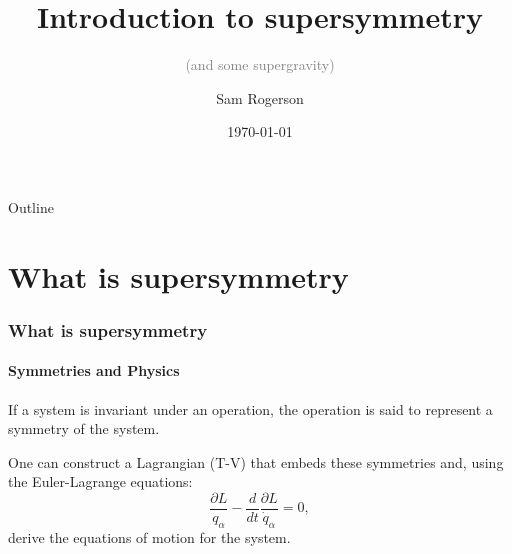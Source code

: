 \documentclass{beamer}
\begin{document}
\title{Introduction to supersymmetry}
\subtitle{\textcolor{gray}{(and some supergravity)}}
\author{Sam Rogerson}
\date{\today}

\begin{frame}[plain]
  \titlepage
\end{frame}

\begin{frame}{Outline}
  \tableofcontents [part=1,hideallsubsections,]
  \tableofcontents [part=2,hideallsubsections,] 
  \tableofcontents [part=3,hideallsubsections,] 
  \tableofcontents [part=4,hideallsubsections,] 
  \tableofcontents [part=5,hideallsubsections,] 
  \tableofcontents [part=6,hideallsubsections,] 
\end{frame}


\part{What is supersymmetry}
\section{What is supersymmetry}
\frame{\partpage}

\subsection{Symmetries and Physics}
\begin{frame}{\insertsubsection}
  \begin{definition}
    If a system is invariant under an operation, the operation is said to represent a symmetry
    of the system.
  \end{definition}
  One can construct a Lagrangian (T-V) that embeds these symmetries and, using the
  Euler-Lagrange equations:
  \begin{equation*}
    \frac{\partial L}{q_{\alpha}}-\frac{d}{dt}\frac{\partial
    L}{\dot{q}_{\alpha}}=0,
  \end{equation*}
  derive the equations of motion for the system.
\end{frame}
\end{document}
